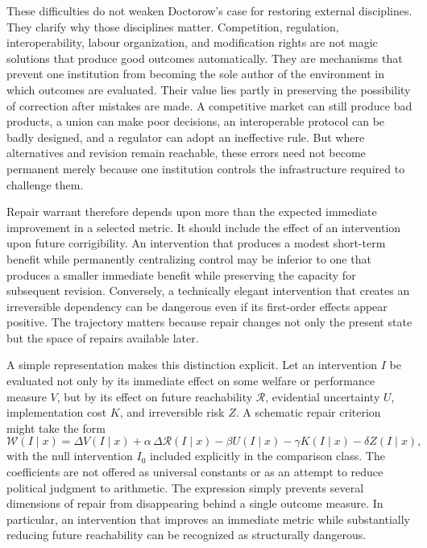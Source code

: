 \documentclass[11pt]{article}
\begin{document}
These difficulties do not weaken Doctorow's case for restoring external disciplines. They clarify why those disciplines matter. Competition, regulation, interoperability, labour organization, and modification rights are not magic solutions that produce good outcomes automatically. They are mechanisms that prevent one institution from becoming the sole author of the environment in which outcomes are evaluated. Their value lies partly in preserving the possibility of correction after mistakes are made. A competitive market can still produce bad products, a union can make poor decisions, an interoperable protocol can be badly designed, and a regulator can adopt an ineffective rule. But where alternatives and revision remain reachable, these errors need not become permanent merely because one institution controls the infrastructure required to challenge them.

Repair warrant therefore depends upon more than the expected immediate improvement in a selected metric. It should include the effect of an intervention upon future corrigibility. An intervention that produces a modest short-term benefit while permanently centralizing control may be inferior to one that produces a smaller immediate benefit while preserving the capacity for subsequent revision. Conversely, a technically elegant intervention that creates an irreversible dependency can be dangerous even if its first-order effects appear positive. The trajectory matters because repair changes not only the present state but the space of repairs available later.

A simple representation makes this distinction explicit. Let an intervention \(I\) be evaluated not only by its immediate effect on some welfare or performance measure \(V\), but by its effect on future reachability \(\mathcal{R}\), evidential uncertainty \(U\), implementation cost \(K\), and irreversible risk \(Z\). A schematic repair criterion might take the form
\[
\mathcal{W}(I\mid x)
=
\Delta V(I\mid x)
+
\alpha\,\Delta \mathcal{R}(I\mid x)
-
\beta U(I\mid x)
-
\gamma K(I\mid x)
-
\delta Z(I\mid x),
\]
with the null intervention \(I_0\) included explicitly in the comparison class. The coefficients are not offered as universal constants or as an attempt to reduce political judgment to arithmetic. The expression simply prevents several dimensions of repair from disappearing behind a single outcome measure. In particular, an intervention that improves an immediate metric while substantially reducing future reachability can be recognized as structurally dangerous.
\end{document}
